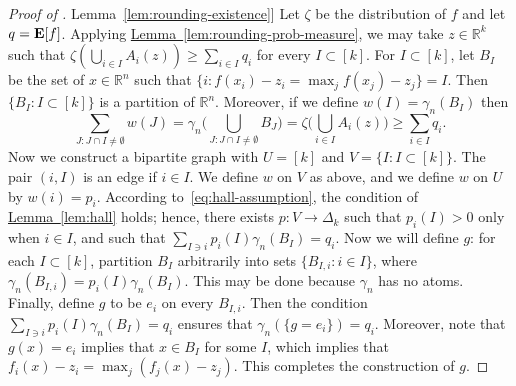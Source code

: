 \documentclass[11pt]{article}
\numberwithin{equation}{section}
\theoremstyle{definition}
\theoremstyle{plain}
\newcommand{\R}{\mathbb R}
\newcommand{\expref}[2]{\hyperref[#2]{#1~\ref{#2}}}
\newcommand{\E}{{\bf E}}
\begin{document}
\begin{proof}[Proof of \expref{Lemma}{lem:rounding-existence}]
    Let $\zeta$ be the distribution of $f$ and let $q = \E[f]$. Applying \expref{Lemma}{lem:rounding-prob-measure},
  we may take $z \in \R^k$ such that
  $\zeta(\bigcup_{i \in I} A_i(z)) \ge \sum_{i \in I} q_i$ for every $I \subset [k]$. For
  $I \subset [k]$, let $B_I$ be the set of $x \in \R^n$ such that $\{i: f(x_i) - z_i = \max_j f(x_j) - z_j\} = I$. Then $\{B_I: I \subset [k]\}$ is a
  partition of $\R^n$. Moreover, if we define $w(I) = \gamma_n(B_I)$ then
  \begin{equation}\label{eq:hall-assumption}
    \sum_{J: J \cap I \ne \emptyset} w(J) = \gamma_n\Big(\bigcup_{J: J \cap I \ne \emptyset} B_J\Big) = \zeta\Big(\bigcup_{i \in I} A_i(z)\Big) \ge \sum_{i \in I} q_i.
  \end{equation}
  Now we construct a bipartite graph with $U = [k]$ and $V = \{I: I \subset [k]\}$. The pair $(i, I)$
  is an edge if $i \in I$. We define $w$ on $V$ as above, and we define $w$ on $U$ by $w(i) = p_i$.
  According to~\eqref{eq:hall-assumption}, the condition of \expref{Lemma}{lem:hall}
  holds; hence, there exists $p: V \to \Delta_k$ such that $p_i(I) > 0$ only when $i \in I$, and
  such that $\sum_{I \ni i} p_i(I) \gamma_n(B_I) = q_i$. Now we will define $g$: for each 
  $I \subset [k]$, partition $B_I$ arbitrarily into sets $\{B_{I,i}: i \in I\}$, where
  $\gamma_n(B_{I,i}) = p_i(I) \gamma_n(B_I)$. This may be done because $\gamma_n$ has no atoms.
  Finally, define $g$ to be $e_i$ on every $B_{I,i}$.
  Then the condition $\sum_{I \ni i} p_i(I) \gamma_n(B_I) = q_i$ ensures that $\gamma_n(\{g = e_i\}) = q_i$.
  Moreover, note that $g(x) = e_i$ implies that $x \in B_I$ for some $I$, which implies
  that $f_i(x) - z_i = \max_j (f_j(x) - z_j)$. This completes the construction of $g$.
\end{proof}
\end{document}
